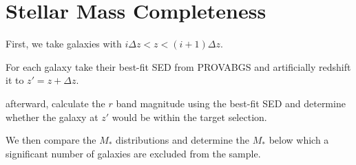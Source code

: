 \section{Stellar Mass Completeness} \label{sec:mscomp}

First, we take galaxies with $i \Delta z < z < (i+1) \Delta z$. 

For each galaxy take their best-fit SED from {\sc PROVABGS} and artificially redshift it to 
$z' = z + \Delta z$.

afterward, calculate the $r$ band magnitude using the best-fit SED and
determine whether the galaxy at $z'$ would be within the target selection. 


We then compare the $M_*$ distributions and determine the $M_*$ below which  a
significant number of galaxies are excluded from the sample.  
